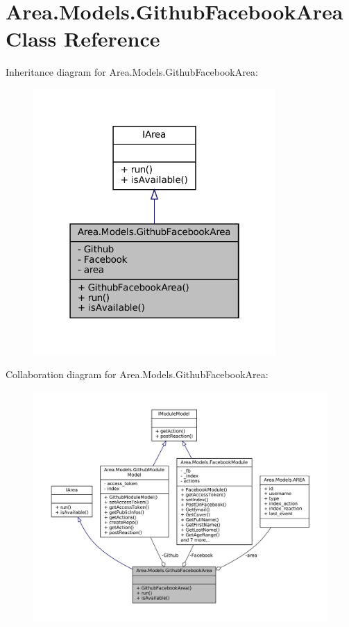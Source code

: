 \hypertarget{classArea_1_1Models_1_1GithubFacebookArea}{}\section{Area.\+Models.\+Github\+Facebook\+Area Class Reference}
\label{classArea_1_1Models_1_1GithubFacebookArea}


Inheritance diagram for Area.\+Models.\+Github\+Facebook\+Area\+:
\nopagebreak
\begin{figure}[H]
\begin{center}
\leavevmode
\includegraphics[width=262pt]{classArea_1_1Models_1_1GithubFacebookArea__inherit__graph}
\end{center}
\end{figure}


Collaboration diagram for Area.\+Models.\+Github\+Facebook\+Area\+:
\nopagebreak
\begin{figure}[H]
\begin{center}
\leavevmode
\includegraphics[width=350pt]{classArea_1_1Models_1_1GithubFacebookArea__coll__graph}
\end{center}
\end{figure}
